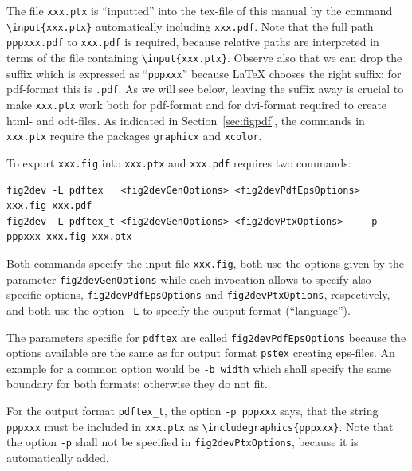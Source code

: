 \documentclass[12pt]{book}
\begin{document}
The file \texttt{xxx.ptx} is ``inputted'' into the tex-file of this manual 
by the command {\tt\textbackslash input\{xxx.ptx\}} 
automatically including \texttt{xxx.pdf}. 
Note that the full path \texttt{pppxxx.pdf} to \texttt{xxx.pdf} is required, 
because relative paths are interpreted in terms of the file 
containing {\tt\textbackslash input\{xxx.ptx\}}. 
Observe also that we can drop the suffix which is expressed as ``\texttt{pppxxx}'' 
because \LaTeX{} chooses the right suffix: 
for pdf-format this is {\tt.pdf}. 
As we will see below, 
leaving the suffix away is crucial to make \texttt{xxx.ptx} work 
both for pdf-format and for dvi-format required to create html- and odt-files. 
As indicated in Section~\ref{sec:figpdf}, 
the commands in \texttt{xxx.ptx} 
require the packages \texttt{graphicx} and \texttt{xcolor}. 

To export \texttt{xxx.fig} into \texttt{xxx.ptx} and \texttt{xxx.pdf} 
requires two commands: 
%
\begin{Verbatim}[fontsize=\scriptsize]
fig2dev -L pdftex   <fig2devGenOptions> <fig2devPdfEpsOptions>           xxx.fig xxx.pdf   
fig2dev -L pdftex_t <fig2devGenOptions> <fig2devPtxOptions>    -p pppxxx xxx.fig xxx.ptx
\end{Verbatim}
%
Both commands specify the input file \texttt{xxx.fig}, 
both use the options given by the parameter \texttt{fig2devGenOptions} 
while each invocation allows to specify also specific options, 
\texttt{fig2devPdfEpsOptions} and \texttt{fig2devPtxOptions}, respectively, 
and both use the option \texttt{-L} to specify the output format (``language''). 


The parameters specific for \texttt{pdftex} are called \texttt{fig2devPdfEpsOptions} 
because the options available are the same 
as for output format \texttt{pstex} creating eps-files. 
An example for a common option would be \texttt{-b width} 
which shall specify the same boundary for both formats; 
otherwise they do not fit. 

For the output format \texttt{pdftex\_t}, 
the option \texttt{-p pppxxx} says, 
that the string \texttt{pppxxx} must be included in \texttt{xxx.ptx} 
as {\tt\textbackslash includegraphics\{pppxxx\}}. 
Note that the option {\tt-p} shall not be specified 
in \texttt{fig2devPtxOptions}, because it is automatically added. 
\end{document}
